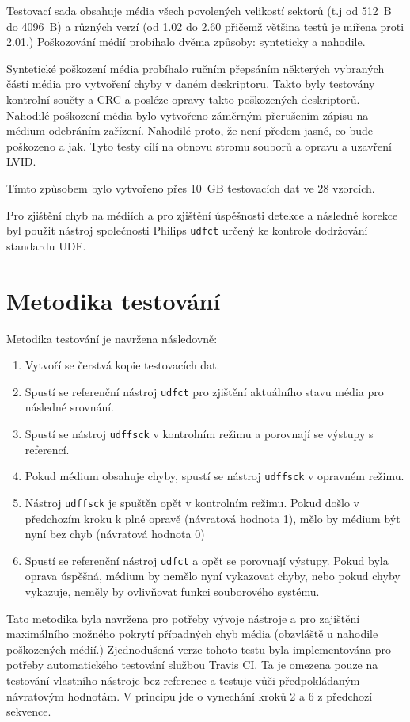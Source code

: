 Testovací sada obsahuje média všech povolených velikostí sektorů (t.j od 512~B do 4096~B) a různých verzí (od 1.02 do 2.60 přičemž většina testů je mířena proti 2.01.) Poškozování médií probíhalo dvěma způsoby: synteticky a nahodile.

Syntetické poškození média probíhalo ručním přepsáním některých vybraných částí média pro vytvoření chyby v daném deskriptoru. Takto byly testovány kontrolní součty a CRC a posléze opravy takto poškozených deskriptorů.
Nahodilé poškození média bylo vytvořeno záměrným přerušením zápisu na médium odebráním zařízení. Nahodilé proto, že není předem jasné, co bude poškozeno a jak. Tyto testy cílí na obnovu stromu souborů a opravu a uzavření LVID.

Tímto způsobem bylo vytvořeno přes 10~GB testovacích dat ve 28 vzorcích.

Pro zjištění chyb na médiích a pro zjištění úspěšnosti detekce a následné korekce byl použit nástroj společnosti Philips \texttt{udfct} \cite{wayback} určený ke kontrole dodržování standardu UDF.

\section{Metodika testování}
\label{sec:metodika}
Metodika testování je navržena následovně:
\begin{enumerate}
    \item Vytvoří se čerstvá kopie testovacích dat.
    \item Spustí se referenční nástroj \texttt{udfct} \cite{wayback} pro zjištění aktuálního stavu média pro následné srovnání.
    \item Spustí se nástroj \texttt{udffsck} v kontrolním režimu a porovnají se výstupy s referencí.
    \item Pokud médium obsahuje chyby, spustí se nástroj \texttt{udffsck} v opravném režimu.
    \item Nástroj \texttt{udffsck} je spuštěn opět v kontrolním režimu. Pokud došlo v předchozím kroku k plné opravě (návratová hodnota 1), mělo by médium být nyní bez chyb (návratová hodnota 0)
    \item Spustí se referenční nástroj \texttt{udfct} a opět se porovnají výstupy. Pokud byla oprava úspěšná, médium by nemělo nyní vykazovat chyby, nebo pokud chyby vykazuje, neměly by ovlivňovat funkci souborového systému.
\end{enumerate}
Tato metodika byla navržena pro potřeby vývoje nástroje a pro zajištění maximálního možného pokrytí případných chyb média (obzvláště u nahodile poškozených médií.) Zjednodušená verze tohoto testu byla implementována pro potřeby automatického testování službou Travis CI. Ta je omezena pouze na testování vlastního nástroje bez reference a testuje vůči předpokládaným návratovým hodnotám. V principu jde o vynechání kroků 2 a 6 z předchozí sekvence.

